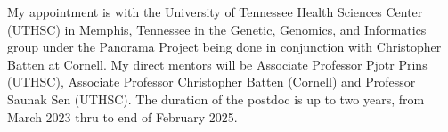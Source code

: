My appointment is with the University of Tennessee Health Sciences Center (UTHSC) in Memphis, Tennessee in the Genetic, Genomics, and Informatics group under the Panorama Project being done in conjunction with Christopher Batten at Cornell.
My direct mentors will be Associate Professor Pjotr Prins (UTHSC), Associate Professor Christopher Batten (Cornell) and Professor Saunak Sen (UTHSC).
The duration of the postdoc is up to two years, from March 2023 thru to end of February 2025.
